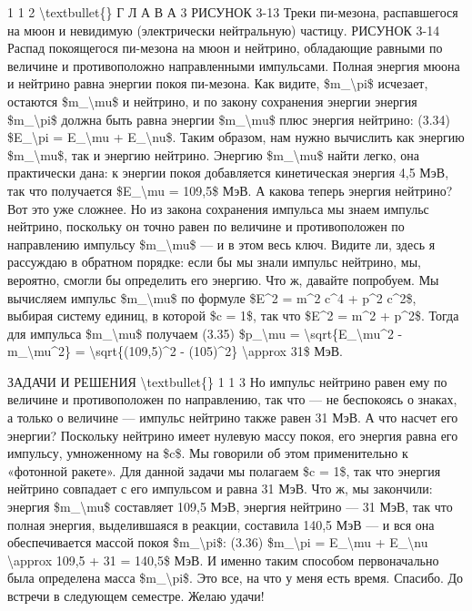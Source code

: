 \documentclass[10pt,oneside]{article}
\begin{document}
1 1 2 \textbackslash{}textbullet\{\} Г Л А В А  3 РИСУНОК 3-13 Треки пи-мезона, распавшегося на мюон и невидимую (электрически нейтральную) частицу. РИСУНОК 3-14 Распад покоящегося пи-мезона на мюон и нейтрино, обладающие равными по величине и противоположно направленными импульсами. Полная энергия мюона и нейтрино равна энергии покоя пи-мезона. Как видите, \$m\_\textbackslash{}pi\$ исчезает, остаются \$m\_\textbackslash{}mu\$ и нейтрино, и по закону сохранения энергии энергия \$m\_\textbackslash{}pi\$ должна быть равна энергии \$m\_\textbackslash{}mu\$ плюс энергия нейтрино: (3.34) \$E\_\textbackslash{}pi = E\_\textbackslash{}mu + E\_\textbackslash{}nu\$. Таким образом, нам нужно вычислить как энергию \$m\_\textbackslash{}mu\$, так и энергию нейтрино. Энергию \$m\_\textbackslash{}mu\$ найти легко, она практически дана: к энергии покоя добавляется кинетическая энергия 4,5 МэВ, так что получается \$E\_\textbackslash{}mu = 109,5\$ МэВ. А какова теперь энергия нейтрино? Вот это уже сложнее. Но из закона сохранения импульса мы знаем импульс нейтрино, поскольку он точно равен по величине и противоположен по направлению импульсу \$m\_\textbackslash{}mu\$ --- и в этом весь ключ. Видите ли, здесь я рассуждаю в обратном порядке: если бы мы знали импульс нейтрино, мы, вероятно, смогли бы определить его энергию. Что ж, давайте попробуем. Мы вычисляем импульс \$m\_\textbackslash{}mu\$ по формуле \$E\textasciicircum{}2 = m\textasciicircum{}2 c\textasciicircum{}4 + p\textasciicircum{}2 c\textasciicircum{}2\$, выбирая систему единиц, в которой \$c = 1\$, так что \$E\textasciicircum{}2 = m\textasciicircum{}2 + p\textasciicircum{}2\$. Тогда для импульса \$m\_\textbackslash{}mu\$ получаем (3.35) \$p\_\textbackslash{}mu = \textbackslash{}sqrt\{E\_\textbackslash{}mu\textasciicircum{}2 - m\_\textbackslash{}mu\textasciicircum{}2\} = \textbackslash{}sqrt\{(109,5)\textasciicircum{}2 - (105)\textasciicircum{}2\} \textbackslash{}approx 31\$ МэВ.\par

ЗАДАЧИ И РЕШЕНИЯ \textbackslash{}textbullet\{\} 1 1 3 Но импульс нейтрино равен ему по величине и противоположен по направлению, так что --- не беспокоясь о знаках, а только о величине --- импульс нейтрино также равен 31 МэВ. А что насчет его энергии? Поскольку нейтрино имеет нулевую массу покоя, его энергия равна его импульсу, умноженному на \$c\$. Мы говорили об этом применительно к «фотонной ракете». Для данной задачи мы полагаем \$c = 1\$, так что энергия нейтрино совпадает с его импульсом и равна 31 МэВ. Что ж, мы закончили: энергия \$m\_\textbackslash{}mu\$ составляет 109,5 МэВ, энергия нейтрино --- 31 МэВ, так что полная энергия, выделившаяся в реакции, составила 140,5 МэВ --- и вся она обеспечивается массой покоя \$m\_\textbackslash{}pi\$: (3.36) \$m\_\textbackslash{}pi = E\_\textbackslash{}mu + E\_\textbackslash{}nu \textbackslash{}approx 109,5 + 31 = 140,5\$ МэВ. И именно таким способом первоначально была определена масса \$m\_\textbackslash{}pi\$. Это все, на что у меня есть время. Спасибо. До встречи в следующем семестре. Желаю удачи!\par
\end{document}
